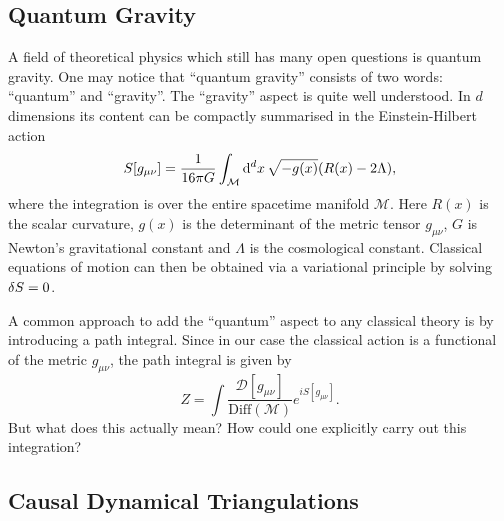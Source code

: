 \subsection{Quantum Gravity}

A field of theoretical physics which still has many open questions is quantum gravity. One may notice that ``quantum gravity'' consists of two words: ``quantum'' and ``gravity''. The ``gravity'' aspect is quite well understood. In $d$ dimensions its content can be compactly summarised in the Einstein-Hilbert action
\begin{equation}
    S[g_{\mu \nu}]
    =
    \frac{1}{16 \pi G}
    \int_{\mathcal{M}} \dd[d]{x} \sqrt{-g(x)}
    \qty(R(x) - 2 \Lambda)
    ,
\end{equation}
where the integration is over the entire spacetime manifold $\mathcal{M}$. Here $R(x)$ is the scalar curvature, $g(x)$ is the determinant of the metric tensor $g_{\mu \nu}$, $G$ is Newton's gravitational constant and $\Lambda$ is the cosmological constant. Classical equations of motion can then be obtained via a variational principle by solving $\variation{S} = 0$.

A common approach to add the ``quantum'' aspect to any classical theory is by introducing a path integral. Since in our case the classical action is a functional of the metric $g_{\mu \nu}$, the path integral is given by
\begin{equation}
    Z
    =
    \int \frac{\mathcal{D}[g_{\mu \nu}]}{\text{Diff}(\mathcal{M})}
    e^{i S[g_{\mu \nu}]}
    .
\end{equation}
But what does this actually mean? How could one explicitly carry out this integration?

\subsection{Causal Dynamical Triangulations}


